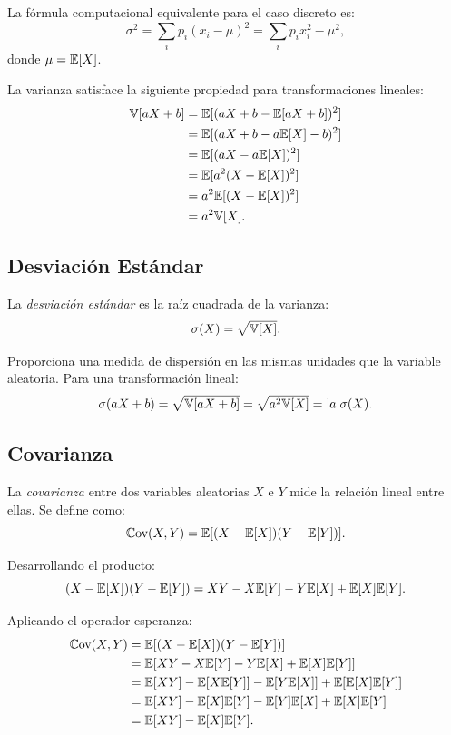La fórmula computacional equivalente para el caso discreto es:
\[
\sigma^2 = \sum_i p_i (x_i - \mu)^2 = \sum_i p_i x_i^2 - \mu^2,
\]
donde $\mu = \mathbb{E}[X]$.

La varianza satisface la siguiente propiedad para transformaciones lineales:
\begin{align*}
\mathbb{V}[aX + b] &= \mathbb{E}[(aX + b - \mathbb{E}[aX + b])^2]\\
            &= \mathbb{E}[(aX + b - a\mathbb{E}[X] - b)^2]\\
            &= \mathbb{E}[(aX - a\mathbb{E}[X])^2]\\
            &= \mathbb{E}[a^2(X - \mathbb{E}[X])^2]\\
            &= a^2\mathbb{E}[(X - \mathbb{E}[X])^2]\\
            &= a^2\mathbb{V}[X].
\end{align*}

\subsection*{Desviación Estándar}

La \textit{desviación estándar} es la raíz cuadrada de la varianza:
\[
\sigma(X) = \sqrt{\mathbb{V}[X]}.
\]

Proporciona una medida de dispersión en las mismas unidades que la variable aleatoria. Para una transformación lineal:
\[
\sigma(aX + b) = \sqrt{\mathbb{V}[aX + b]} = \sqrt{a^2\mathbb{V}[X]} = |a|\sigma(X).
\]

\subsection*{Covarianza}

La \textit{covarianza} entre dos variables aleatorias $X$ e $Y$ mide la relación lineal entre ellas. Se define como:
\[
\mathbb{C}\text{ov}(X,Y) = \mathbb{E}[(X - \mathbb{E}[X])(Y - \mathbb{E}[Y])].
\]

Desarrollando el producto:
\[
(X - \mathbb{E}[X])(Y - \mathbb{E}[Y]) = XY - X\mathbb{E}[Y] - Y\mathbb{E}[X] + \mathbb{E}[X]\mathbb{E}[Y].
\]

Aplicando el operador esperanza:
\begin{align*}
\mathbb{C}\text{ov}(X,Y) &= \mathbb{E}[(X - \mathbb{E}[X])(Y - \mathbb{E}[Y])]\\
          &= \mathbb{E}[XY - X\mathbb{E}[Y] - Y\mathbb{E}[X] + \mathbb{E}[X]\mathbb{E}[Y]]\\
          &= \mathbb{E}[XY] - \mathbb{E}[X\mathbb{E}[Y]] - \mathbb{E}[Y\mathbb{E}[X]] + \mathbb{E}[\mathbb{E}[X]\mathbb{E}[Y]]\\
          &= \mathbb{E}[XY] - \mathbb{E}[X]\mathbb{E}[Y] - \mathbb{E}[Y]\mathbb{E}[X] + \mathbb{E}[X]\mathbb{E}[Y]\\
          &= \mathbb{E}[XY] - \mathbb{E}[X]\mathbb{E}[Y].
\end{align*}

